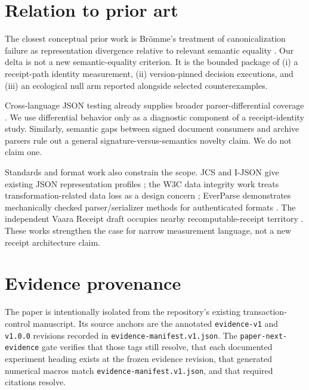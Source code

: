 \documentclass[10pt,twocolumn,letterpaper]{article}
\begin{document}
\section{Relation to prior art}
\label{sec:related}

The closest conceptual prior work is Brömme's treatment of canonicalization
failure as representation divergence relative to relevant semantic equality
\cite{bromme2026canonicalization}.  Our delta is not a new semantic-equality
criterion.  It is the bounded package of (i) a receipt-path identity
measurement, (ii) version-pinned decision executions, and (iii) an ecological
null arm reported alongside selected counterexamples.

Cross-language JSON testing already supplies broader parser-differential
coverage \cite{moller2024cross}.  We use differential behavior only as a
diagnostic component of a receipt-identity study.  Similarly, semantic gaps
between signed document consumers \cite{rohlmann2023signature} and archive
parsers \cite{you2025zip} rule out a general signature-versus-semantics
novelty claim.  We do not claim one.

Standards and format work also constrain the scope.  JCS and I-JSON give
existing JSON representation profiles \cite{rfc8785,rfc7493}; the W3C data
integrity work treats transformation-related data loss as a design concern
\cite{w3c-vcdi-2025}; EverParse demonstrates mechanically checked
parser/serializer methods for authenticated formats
\cite{ramananandro2019everparse}.  The independent Vaara Receipt draft
occupies nearby recomputable-receipt territory
\cite{sirkkavaara2026vaara}.  These works strengthen the case for narrow
measurement language, not a new receipt architecture claim.

\section{Evidence provenance}
\label{sec:artifact}

The paper is intentionally isolated from the repository's existing
transaction-control manuscript.  Its source anchors are the annotated
\texttt{evidence-v1} and \texttt{v1.0.0} revisions recorded in
\texttt{evidence-manifest.v1.json}.  The
\texttt{paper-next-evidence} gate verifies that those tags still resolve,
that each documented experiment heading exists at the frozen evidence
revision, that generated numerical macros match
\texttt{evidence-manifest.v1.json}, and that required citations resolve.
\end{document}
